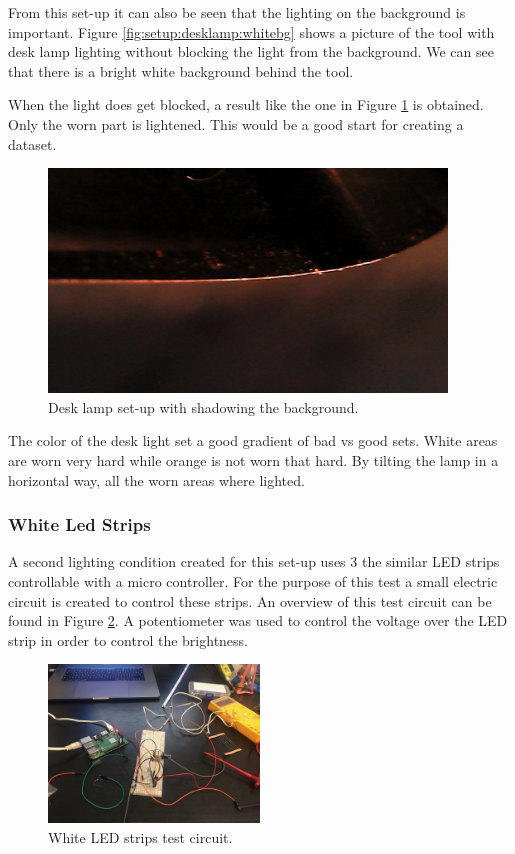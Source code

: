 From this set-up it can also be seen that the lighting on the background is important. Figure \ref{fig:setup:desklamp:whitebg} shows a picture of the tool with desk lamp lighting without blocking the light from the background. We can see that there is a bright white background behind the tool. 

When the light does get blocked, a result like the one in Figure \ref{fig:setup:desklamp:blackbg} is obtained. Only the worn part is lightened. This would be a good start for creating a dataset.

\begin{figure}[hbtp]
\centering
\includegraphics[width=4.166667in, keepaspectratio=true]{./fig/Camera_setup/Light/Desk_Lamp_Test/eerste-opstelling_donkere_achtergrond2.jpg}
\caption{Desk lamp set-up with shadowing the background.}
\label{fig:setup:desklamp:blackbg}
\end{figure}

The color of the desk light set a good gradient of bad vs good sets. White areas are worn very hard while orange is not worn that hard. By tilting the lamp in a horizontal way, all the worn areas where lighted. 

		\subsubsection{White Led Strips}

		A second lighting condition created for this set-up uses 3 the similar LED strips controllable with a micro controller. 
		For the purpose of this test a small electric circuit is created to control these strips. An overview of this test circuit can be found in Figure \ref{fig:setup:whiteled:circuit}. A potentiometer was used to control the voltage over the LED strip in order to control the brightness. 

		\begin{figure}[hbtp]
			\centering
			\includegraphics[width=0.5\textwidth, keepaspectratio=true]{./fig/Camera_setup/Light/White_Led_Strips/Test_setup_ledstrip.jpeg}
			\caption{White LED strips test circuit.}
			\label{fig:setup:whiteled:circuit}
		\end{figure}

